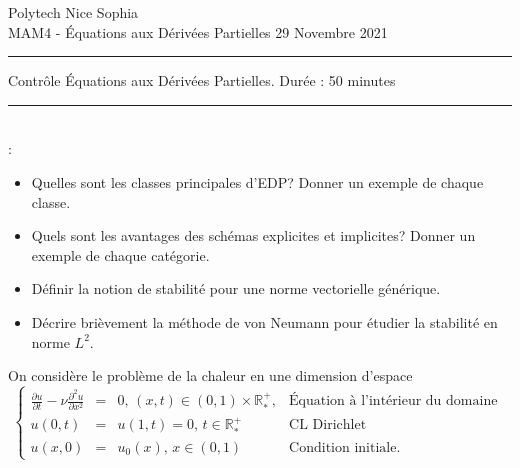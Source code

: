 \documentclass[12pt,a4paper]{article}
\begin{document}
 \hfill Polytech Nice Sophia \\
\noindent MAM4 - \'Equations aux D\'eriv\'ees Partielles \hfill 
29 Novembre 2021 \\

\hrule

\vspace{1cm}
\centerline {\large \sc Contrôle \'Equations aux D\'eriv\'ees Partielles. Dur\'ee : 50 minutes}
\vspace{1cm}


\hrule
\vspace{1cm}
\\

:
\begin{itemize}
\item Quelles sont les classes principales d'EDP? Donner un exemple de chaque classe.
\item Quels sont les avantages des schémas explicites et implicites? Donner un exemple de chaque catégorie.
\item Définir la notion de stabilité pour une norme vectorielle générique. 
\item Décrire brièvement la méthode de von Neumann pour étudier la stabilité en norme $L^2$.
\end{itemize}

\noindent On consid\`ere le probl\`eme de la chaleur en une dimension
d'espace 
\begin{equation}\label{eq:heat}
\left\{\begin{array}{lcll}
\displaystyle\frac{\partial u}{\partial t} - \nu \frac{\partial^2 u}{\partial x^2}&=
&0,\,
(x,t)\in (0,1)\times\mathbb{R}_*^+, & \text{Équation à l'intérieur du domaine } \\
u(0,t)&=&u(1,t) = 0,\, t\in \mathbb{R}_*^+ &\text{CL Dirichlet}\\
u(x,0)&=&u_0(x),\, x\in (0,1) & \text {Condition initiale}.
\end{array}\right.
\end{equation}

\end{document}

